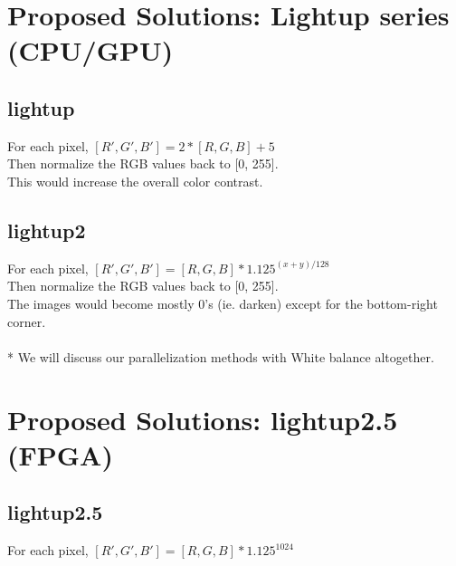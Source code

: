 \documentclass{acm_proc_article-sp}
\begin{document}
\section{Proposed Solutions: Lightup series (CPU/GPU)}
\subsection{lightup}
For each pixel, \([R', G', B'] = 2 * [R, G, B] + 5\) \\
Then normalize the RGB values back to [0, 255]. \\
This would increase the overall color contrast.
\subsection{lightup2}
For each pixel, \([R', G', B'] = [R, G, B] * 1.125^{(x + y) / 128}\) \\
Then normalize the RGB values back to [0, 255]. \\
The images would become mostly 0's (ie. darken) except for the bottom-right corner. \\
\\
* We will discuss our parallelization methods with White balance altogether.

\section{Proposed Solutions: lightup2.5 (FPGA)}
\subsection{lightup2.5}
For each pixel, \([R', G', B'] = [R, G, B] * 1.125^{1024}\)
\end{document}
